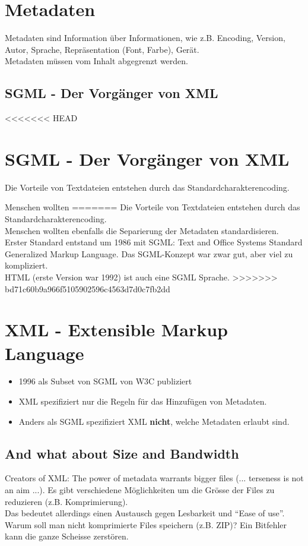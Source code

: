 \section{Metadaten}
Metadaten sind Information über Informationen, wie z.B. Encoding, Version, Autor, Sprache, Repräsentation (Font, Farbe), Gerät.\\
Metadaten müssen vom Inhalt abgegrenzt werden.

\subsection{SGML - Der Vorgänger von XML}

<<<<<<< HEAD
\section{SGML - Der Vorgänger von XML}

Die Vorteile von Textdateien entstehen durch das Standardcharakterencoding.

Menschen wollten
=======
Die Vorteile von Textdateien entstehen durch das Standardcharakterencoding.\\
Menschen wollten ebenfalls die Separierung der Metadaten standardisieren.\\
Erster Standard entstand um 1986 mit SGML: Text and Office Systems Standard Generalized Markup Language. Das SGML-Konzept war zwar gut, aber viel zu kompliziert.\\
HTML (erste Version war 1992) ist auch eine SGML Sprache.
>>>>>>> bd71c60b9a966f5105902596c4563d7d0c7fb2dd

\section{XML - Extensible Markup Language}
\begin{itemize}
\item 1996 als Subset von SGML von W3C publiziert
\item XML spezifiziert nur die Regeln für das Hinzufügen von Metadaten.
\item Anders als SGML spezifiziert XML \textbf{nicht}, welche Metadaten erlaubt sind.
\end{itemize}

\subsection{And what about Size and Bandwidth}
Creators of XML: The power of metadata warrants bigger files (... terseness is not an aim ...).
Es gibt verschiedene Möglichkeiten um die Grösse der Files zu reduzieren (z.B. Komprimierung).\\
Das bedeutet allerdings einen Austausch gegen Lesbarkeit und "`Ease of use"'.\\
Warum soll man nicht komprimierte Files speichern (z.B. ZIP)? Ein Bitfehler kann die ganze Scheisse zerstören.

